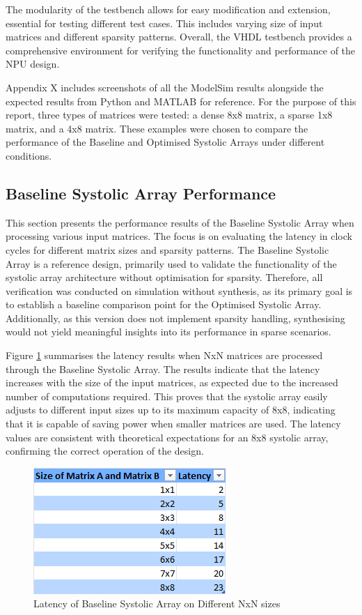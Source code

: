 \documentclass[12pt, a4paper, ukenglish]{article}
\newcommand{\baselineNxN}{
    \begin{figure}[ht]
        \centering
        \includegraphics[width=0.3\linewidth]{results/Latency of Baseline Systolic Array on Different NxN sizes.png}
        \caption{Latency of Baseline Systolic Array on Different NxN sizes}
        \label{fig:latency_baseline_nxn}
    \end{figure}
}
\begin{document}
    The modularity of the testbench allows for easy modification and extension, essential for testing different test cases. This includes varying size of input matrices and different sparsity patterns. Overall, the VHDL testbench provides a comprehensive environment for verifying the functionality and performance of the NPU design.

    Appendix X includes screenshots of all the ModelSim results alongside the expected results from Python and MATLAB for reference. For the purpose of this report, three types of matrices were tested: a dense 8x8 matrix, a sparse 1x8 matrix, and a 4x8 matrix. These examples were chosen to compare the performance of the Baseline and Optimised Systolic Arrays under different conditions.


    
    \subsection{Baseline Systolic Array Performance} \label{sec: perform base}

    This section presents the performance results of the Baseline Systolic Array when processing various input matrices. The focus is on evaluating the latency in clock cycles for different matrix sizes and sparsity patterns. The Baseline Systolic Array is a reference design, primarily used to validate the functionality of the systolic array architecture without optimisation for sparsity. Therefore, all verification was conducted on simulation without synthesis, as its primary goal is to establish a baseline comparison point for the Optimised Systolic Array. Additionally, as this version does not implement sparsity handling, synthesising would not yield meaningful insights into its performance in sparse scenarios.

    Figure \ref{fig:latency_baseline_nxn} summarises the latency results when NxN matrices are processed through the Baseline Systolic Array. The results indicate that the latency increases with the size of the input matrices, as expected due to the increased number of computations required. This proves that the systolic array easily adjusts to different input sizes up to its maximum capacity of 8x8, indicating that it is capable of saving power when smaller matrices are used. The latency values are consistent with theoretical expectations for an 8x8 systolic array, confirming the correct operation of the design.
    \baselineNxN

    
\end{document}
